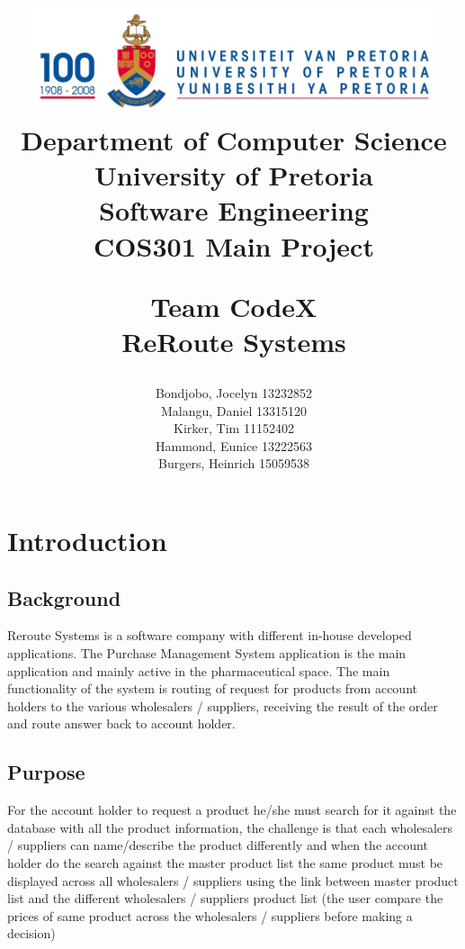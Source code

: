 \documentclass[a4paper,10pt]{article}
\title{\includegraphics[width=12cm]{Eeufeeslogo.jpg} \\
       Department of Computer Science \\
       University of Pretoria \\
       \vspace{0.5cm}
       Software Engineering\\
       COS301 Main Project \\
       \vspace{0.5cm}
       \begin{large} \textbf{Team CodeX}\\ ReRoute Systems\end{large}}
\date{}
\author{	Bondjobo, Jocelyn 		13232852 		\\
		Malangu, Daniel		13315120		\\
		Kirker, Tim			11152402		\\
		Hammond, Eunice		13222563		\\
		Burgers, Heinrich		15059538		\\
}
\begin{document}
\maketitle
\thispagestyle{empty}
\clearpage

\newpage
{}
\thispagestyle{empty}
\tableofcontents
\clearpage

\newpage
{}

\section{Introduction}

	\subsection{Background} 
	Reroute Systems is a software company with different in-house developed applications. The Purchase Management System application is the main application and mainly active in the 		pharmaceutical space. The main functionality of the system is routing of request for products from account holders to the various wholesalers / suppliers, receiving the result of the order and route answer back to account holder.
	
	\subsection{Purpose} 	
	For the account holder to request a product he/she must search for it against the database with all the product information, the challenge is that each wholesalers / suppliers can name/describe the product differently and when the account holder do the search against the master product list the same product must be displayed across all wholesalers / suppliers using the link between master product list and the different wholesalers / suppliers product list (the user compare the prices of same product across the wholesalers / suppliers before making a decision)
\end{document}
